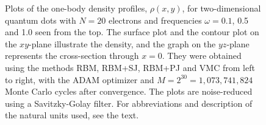 \begin{landscape}
\begin{figure} [H]
		\caption{Plots of the one-body density profiles, $\rho(x,y)$, for two-dimensional quantum dots with $N=20$ electrons and frequencies $\omega=0.1$, 0.5 and 1.0 seen from the top. The surface plot and the contour plot on the $xy$-plane illustrate the density, and the graph on the $yz$-plane represents the cross-section through $x=0$. They were obtained using the methods RBM, RBM+SJ, RBM+PJ and VMC from left to right, with the ADAM optimizer and $M=2^{30}=1,073,741,824$ Monte Carlo cycles after convergence. The plots are noise-reduced using a Savitzky-Golay filter. For abbreviations and description of the natural units used, see the text.}%
		\label{fig:OB2_interaction_20P}
	\end{figure}
	\begin{figure} [H]%
		\centering
		\captionsetup[subfigure]{labelformat=empty}
		\captionsetup{width=0.9\hsize}
		\hspace{0.1cm}
		\hspace{-0.0cm}
		\hspace{-0.0cm}
		\hspace{-0.0cm}

\end{figure}
\end{landscape}
